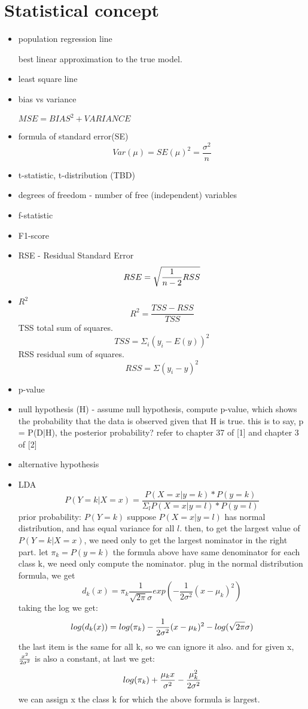 \documentclass[10pt,a4paper]{book}
\begin{document}
\section{Statistical concept}
\begin{itemize}
\item
population regression line

best linear approximation to the true model.
\item least square line

\item bias vs variance

$MSE = BIAS^2 + VARIANCE$


\item formula of standard error(SE)
$$ Var(\mu) = SE(\mu)^2 = \frac {\sigma^2} {n} $$

\item t-statistic, t-distribution (TBD)

\item degrees of freedom - number of free (independent) variables

\item f-statistic
\item F1-score
\item RSE - Residual Standard Error
$$RSE = \sqrt{{1 \over {n-2}} RSS}$$
\item $R^2$   
$$R^2 = {\frac {TSS - RSS} {TSS}}$$
TSS total sum of squares. 
$$TSS = \Sigma_i(y_i - E(y))^2$$  
RSS residual sum of squares. 
$$RSS = \Sigma(y_i - y)^2$$

\item p-value  
\item null hypothesis (H) - assume null hypothesis, compute p-value, which shows the probability that the data is observed given that H is true. this is to say, p = P(D|H), the posterior probability? refer to chapter 37 of [1] and chapter 3 of [2]

\item alternative hypothesis

\item LDA  
$$ P(Y=k|X=x) = \frac {P(X=x|y=k) * P(y=k)}  {\Sigma_l P(X=x|y=l) * P(y=l) }$$
prior probability: $P(Y=k)$   
suppose $P(X=x|y=l)$ has normal distribution, and has equal variance for all $l$. then, to get the largest value of $P(Y=k|X=x)$, we need only to get the largest nominator in the right part.  
let $\pi_k = P(y=k)$
the formula above have same denominator for each class k, we need only compute the nominator. plug in the normal distribution formula, we get
$$ d_k(x) = \pi_k{\frac 1 {\sqrt{2\pi} \sigma }} exp({-{\frac 1 {2 \sigma^2}}(x - \mu_k)^2}) $$  
taking the log we get:  
$$log(d_k(x)) = log(\pi_k) -{1 \over 2 \sigma^2}(x - \mu_k)^2 - log(\sqrt{2\pi} \sigma) $$  
the last item is the same for all k, so we can ignore it also.  
and for given x, $x^2 \over {2 \sigma^2}$ is also a constant, at last we get:  
$$log(\pi_k) + {\mu_k x \over \sigma^2} - {\mu_k^2 \over 2 \sigma^2}$$
we can assign  x the class k for which the above formula is largest.

\end{itemize}
\end{document}
